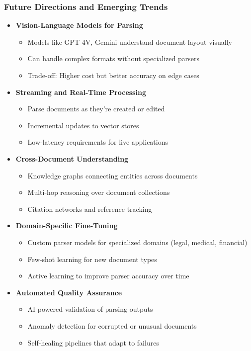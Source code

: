 \begin{frame}[fragile]\frametitle{Future Directions and Emerging Trends}
      \begin{itemize}
        \item \textbf{Vision-Language Models for Parsing}
        \begin{itemize}
            \item Models like GPT-4V, Gemini understand document layout visually
            \item Can handle complex formats without specialized parsers
            \item Trade-off: Higher cost but better accuracy on edge cases
        \end{itemize}
        \item \textbf{Streaming and Real-Time Processing}
        \begin{itemize}
            \item Parse documents as they're created or edited
            \item Incremental updates to vector stores
            \item Low-latency requirements for live applications
        \end{itemize}
        \item \textbf{Cross-Document Understanding}
        \begin{itemize}
            \item Knowledge graphs connecting entities across documents
            \item Multi-hop reasoning over document collections
            \item Citation networks and reference tracking
        \end{itemize}
        \item \textbf{Domain-Specific Fine-Tuning}
        \begin{itemize}
            \item Custom parser models for specialized domains (legal, medical, financial)
            \item Few-shot learning for new document types
            \item Active learning to improve parser accuracy over time
        \end{itemize}
        \item \textbf{Automated Quality Assurance}
        \begin{itemize}
            \item AI-powered validation of parsing outputs
            \item Anomaly detection for corrupted or unusual documents
            \item Self-healing pipelines that adapt to failures
        \end{itemize}
      \end{itemize}
\end{frame}

